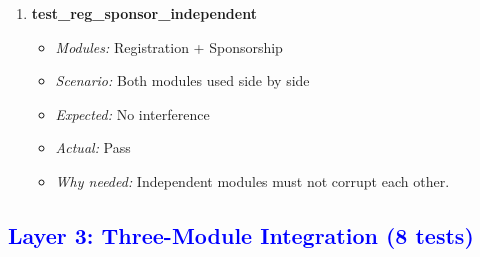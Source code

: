 \documentclass{article}
\begin{document}
\begin{enumerate}[resume, label=\textbf{TC\arabic*.}]
\item \textbf{test\_reg\_sponsor\_independent}
\begin{itemize}[noitemsep]
  \item \textit{Modules:} Registration + Sponsorship
  \item \textit{Scenario:} Both modules used side by side
  \item \textit{Expected:} No interference
  \item \textit{Actual:} Pass
  \item \textit{Why needed:} Independent modules must not corrupt each other.
\end{itemize}

\end{enumerate}


\subsection*{\textcolor{blue}{Layer 3: Three-Module Integration (8 tests)}}
\end{document}

